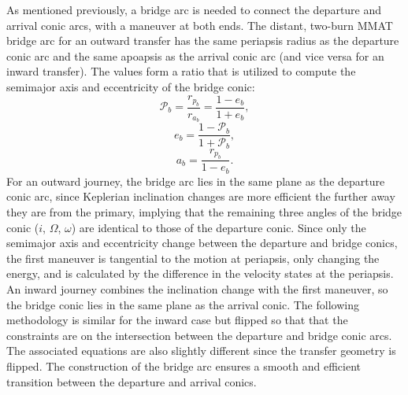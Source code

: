 As mentioned previously, a bridge arc is needed to connect the departure and arrival conic arcs,
with a maneuver at both ends. The distant, two-burn MMAT bridge arc for an outward transfer has the
same periapsis radius as the departure conic arc and the same apoapsis as the arrival conic arc
(and vice versa for an inward transfer). The values form a ratio that is utilized to compute the
semimajor axis and eccentricity of the bridge conic:
\begin{equation}
    \mathcal{P}_{b}=\frac{r_{p_{b}}}{r_{a_{b}}}=\frac{1-e_{b}}{1+e_{b}},
    \label{eq:bridgeratio}
\end{equation}
\vspace{1mm}
\begin{equation}
    e_{b}=\frac{1-\mathcal{P}_{b}}{1+\mathcal{P}_{b}},
    \label{eq:bridgeeccentricity}
\end{equation}
\vspace{1mm}
\begin{equation}
    a_{b}=\frac{r_{p_{b}}}{1-e_{b}}.
    \label{eq:bridgesemimajoraxis}
\end{equation}
For an outward journey, the bridge arc lies in the same plane as the departure conic arc, since
Keplerian inclination changes are more efficient the further away they are from the primary,
implying that the remaining three angles of the bridge conic ($i$, $\Omega$, $\omega$) are
identical to those of the departure conic. Since only the semimajor axis and eccentricity change
between the departure and bridge conics, the first maneuver is tangential to the motion at
periapsis, only changing the energy, and is calculated by the difference in the velocity states at
the periapsis. An inward journey combines the inclination change with the first maneuver, so the
bridge conic lies in the same plane as the arrival conic. The following methodology is similar for
the inward case but flipped so that that the constraints are on the intersection between the
departure and bridge conic arcs. The associated equations are also slightly different since the
transfer geometry is flipped. The construction of the bridge arc ensures a smooth and efficient
transition between the departure and arrival conics.

